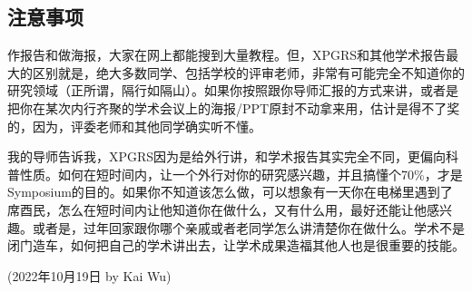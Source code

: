 \subsection{注意事项}

作报告和做海报，大家在网上都能搜到大量教程。但，XPGRS和其他学术报告最大的区别就是，绝大多数同学、包括学校的评审老师，非常有可能完全不知道你的研究领域（正所谓，隔行如隔山）。如果你按照跟你导师汇报的方式来讲，或者是把你在某次内行齐聚的学术会议上的海报/PPT原封不动拿来用，估计是得不了奖的，因为，评委老师和其他同学确实听不懂。

我的导师告诉我，XPGRS因为是给外行讲，和学术报告其实完全不同，更偏向科普性质。如何在短时间内，让一个外行对你的研究感兴趣，并且搞懂个70\%，才是Symposium的目的。如果你不知道该怎么做，可以想象有一天你在电梯里遇到了席酉民，怎么在短时间内让他知道你在做什么，又有什么用，最好还能让他感兴趣。或者是，过年回家跟你哪个亲戚或者老同学怎么讲清楚你在做什么。学术不是闭门造车，如何把自己的学术讲出去，让学术成果造福其他人也是很重要的技能。

\begin{flushright}
(2022年10月19日 by Kai Wu)
\end{flushright}